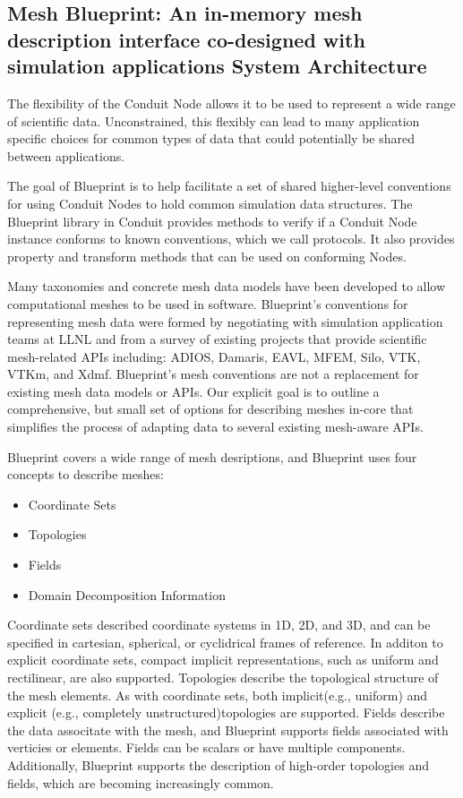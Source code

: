 \subsection{Mesh Blueprint: An in-memory mesh description interface co-designed with simulation applications
System Architecture}

The flexibility of the Conduit Node allows it to be used to represent a
wide range of scientific data.
%
Unconstrained, this flexibly can lead to
many application specific choices for common types of data that could
potentially be shared between applications.

The goal of Blueprint is to help facilitate a set of shared higher-level
conventions for using Conduit Nodes to hold common simulation data structures.
%
The Blueprint library in Conduit provides methods to verify if a Conduit
Node instance conforms to known conventions, which we call protocols.
%
It also provides property and transform methods that can be used on conforming Nodes.

Many taxonomies and concrete mesh data models have been developed to allow
computational meshes to be used in software.
%
Blueprint’s conventions for representing mesh data were formed by negotiating
with simulation application teams at LLNL and from a survey of existing
projects that provide scientific mesh-related APIs including: ADIOS, Damaris,
EAVL, MFEM, Silo, VTK, VTKm, and Xdmf.
%
Blueprint’s mesh conventions are not a replacement for existing mesh data
models or APIs.
%
Our explicit goal is to outline a comprehensive, but small set of options
for describing meshes in-core that simplifies the process of adapting data
to several existing mesh-aware APIs.

Blueprint covers a wide range of mesh desriptions, and
Blueprint uses four concepts to describe meshes:

\begin{itemize}
  \item Coordinate Sets
  \item Topologies
  \item Fields
  \item Domain Decomposition Information
\end{itemize}

Coordinate sets described coordinate systems in 1D, 2D, and 3D, and
can be specified in cartesian, spherical, or cyclidrical frames of reference.
%
In additon to explicit coordinate sets, compact implicit representations,
such as uniform and rectilinear, are also supported.
%
Topologies describe the topological structure of the mesh elements.
%
As with coordinate sets, both implicit(e.g., uniform) and explicit
(e.g., completely unstructured)topologies are supported.
%
Fields describe the data associtate with the mesh, and Blueprint supports
fields associated with verticies or elements.
%
Fields can be scalars or have multiple components.
%
Additionally, Blueprint supports the description of high-order
topologies and fields, which are becoming increasingly common.

